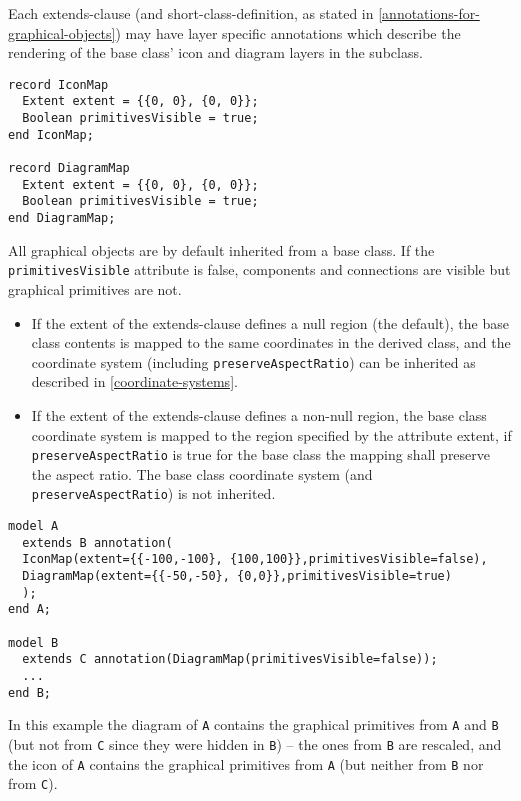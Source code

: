 Each extends-clause (and short-class-definition, as stated in \cref{annotations-for-graphical-objects})
may have layer specific annotations which describe
the rendering of the base class' icon and diagram layers in the
subclass.

\begin{lstlisting}[language=modelica]
record IconMap
  Extent extent = {{0, 0}, {0, 0}};
  Boolean primitivesVisible = true;
end IconMap;

record DiagramMap
  Extent extent = {{0, 0}, {0, 0}};
  Boolean primitivesVisible = true;
end DiagramMap;
\end{lstlisting}
All graphical objects are by default inherited from a base class. If the
\lstinline!primitivesVisible! attribute is false, components and connections are
visible but graphical primitives are not.

\begin{itemize}
\item
  If the extent of the extends-clause defines a null region (the default), the base class contents is mapped to the same coordinates in the derived class, and the coordinate system (including \lstinline!preserveAspectRatio!) can be inherited as described in \cref{coordinate-systems}.
\item
  If the extent of the extends-clause defines a non-null region, the base class coordinate system is mapped to the region specified by the attribute extent, if \lstinline!preserveAspectRatio! is true for the base class the mapping shall preserve the aspect ratio.  The base class coordinate system (and \lstinline!preserveAspectRatio!) is not inherited.
\end{itemize}

\begin{example}
\begin{lstlisting}[language=modelica]
model A
  extends B annotation(
  IconMap(extent={{-100,-100}, {100,100}},primitivesVisible=false),
  DiagramMap(extent={{-50,-50}, {0,0}},primitivesVisible=true)
  );
end A;

model B
  extends C annotation(DiagramMap(primitivesVisible=false));
  ...
end B;
\end{lstlisting}
In this example the diagram of \lstinline!A! contains the graphical primitives
from \lstinline!A! and \lstinline!B! (but not from \lstinline!C! since they were hidden in \lstinline!B!) -- the ones
from \lstinline!B! are rescaled, and the icon of \lstinline!A! contains the graphical primitives
from \lstinline!A! (but neither from \lstinline!B! nor from \lstinline!C!).
\end{example}

